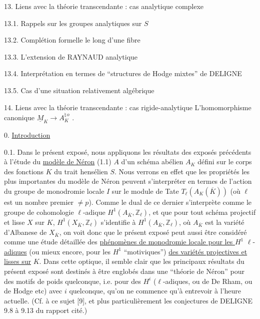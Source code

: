 13. Liens avec la théorie transcendante : cas analytique complexe

13.1. Rappels sur les groupes analytiques sur $S$

13.2. Complétion formelle le long d'une fibre

13.3. L'extension de RAYNAUD analytique

13.4. Interprétation en termes de ``structures de Hodge mixtes'' de DELIGNE

13.5. Cas d'une situation relativement algébrique

14. Liens avec la théorie transcendante : cas rigide-analytique L'homomorphisme canonique $\underline{M}_K \longrightarrow A_K^{\natural\,o}$ .


0. \underline{Introduction}

0.1. Dans le présent exposé, nous appliquons les résultats des exposés précédents à l'étude du \underline{modèle de Néron} (1.1) $A$ d'un schéma abélien $A_K$ défini sur le corps des fonctions $K$ du trait hensélien $S$. Nous verrons en effet que les propriétés les plus importantes du modèle de Néron peuvent s'interpréter en termes de l'action du groupe de monodromie locale $I$ sur le module de Tate $T_\ell(A_K(\overline{K}))$ (où $\ell$ est un nombre premier $\neq p$). Comme le dual de ce dernier s'interprète comme le groupe de cohomologie $\ell$-adique $H^1(A_{\overline{K}},\mathbb{Z}_\ell)$, et que pour tout schéma projectif et lisse $X$ sur $K$, $H^1(X_{\overline{K}},\mathbb{Z}_\ell)$ s'identifie à $H^1(A_{\overline{K}},\mathbb{Z}_\ell)$, où $A_{\overline{K}}$ est la variété d'Albanese de $X_{\overline{K}}$, on voit donc que le présent exposé peut aussi être considéré comme une étude détaillée des \underline{phénomènes de monodromie locale pour les $H^1$} $\ell$-\underline{adiques} (ou mieux encore, pour les $H^1$ ``motiviques'') \underline{des variétés projectives et lisses sur} $K$. Dans cette optique, il semble clair que les principaux résultats du présent exposé sont destinés à être englobés dans une ``théorie de Néron'' pour des motifs de poids quelconque, i.e. pour des $H^i$ ($\ell$-adiques, ou de De Rham, ou de Hodge etc) avec $i$ quelconque, qu'on ne commence qu'à entrevoir à l'heure actuelle. (Cf. à ce sujet [9], et plus particulièrement les conjectures de DELIGNE 9.8 à 9.13 du rapport cité.)



